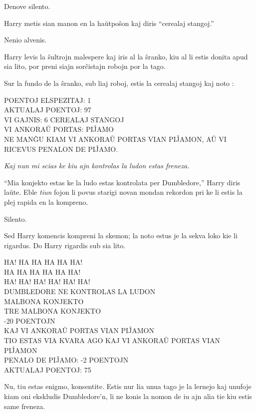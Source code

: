 Denove silento.

Harry metis sian manon en la haŭtpoŝon kaj diris ``cerealaj stangoj.''

Nenio alvenis.

Harry levis la ŝultrojn malespere kaj iris al la ŝranko, kiu al li estis donita
apud sia lito, por preni siajn sorĉistajn robojn por la tago.

Sur la fundo de la ŝranko, sub liaj roboj, estis la cerealaj stangoj
kaj noto :

\medskip
\begin{center}
  POENTOJ ELSPEZITAJ: 1\\
  AKTUALAJ POENTOJ: 97\\
  VI GAJNIS: 6 CEREALAJ STANGOJ\\
  VI ANKORAŬ PORTAS: PIĴAMO\\
  NE MANĜU KIAM VI ANKORAŬ PORTAS VIAN PIĴAMON, AŬ VI RICEVUS PENALON DE PIĴAMO.
\end{center}
\medskip

\emph{Kaj nun mi scias ke kiu ajn kontrolas la ludon estas freneza.}

``Mia konjekto estas ke la ludo estas kontrolata per Dumbledore,''
Harry diris laŭte. Eble \emph{tiun} fojon li povus starigi novan mondan
rekordon pri ke li estis la plej rapida en la kompreno.

Silento.

Sed Harry komencis kompreni la skemon; la noto estus je la sekva loko
kie li rigardus. Do Harry rigardis sub sia lito.

\medskip
\begin{center}
  HA! HA HA HA HA HA!\\
  HA HA HA HA HA HA!\\
  HA! HA! HA! HA! HA! HA!\\
  DUMBLEDORE NE KONTROLAS LA LUDON\\
  MALBONA KONJEKTO\\
  TRE MALBONA KONJEKTO\\
  -20 POENTOJN\\
  KAJ VI ANKORAŬ PORTAS VIAN PIĴAMON\\
  TIO ESTAS VIA KVARA AGO KAJ VI ANKORAŬ PORTAS VIAN PIĴAMON\\
  PENALO DE PIĴAMO: -2 POENTOJN\\
  AKTUALAJ POENTOJ: 75
\end{center}

Nu, tiu estas enigmo, konsentite. Estis nur lia unua tago je la lernejo kaj
unufoje kiam oni ekskludis Dumbledore'n, li ne konis la nomon de iu ajn alia tie
kiu estis same freneza.

